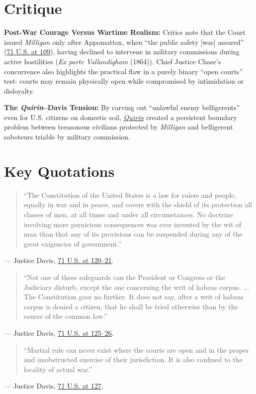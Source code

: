 \documentclass[12pt]{article}
\begin{document}
\section{Critique}
\textbf{Post-War Courage Versus Wartime Realism:} Critics note that the Court issued \textit{Milligan} only after Appomattox, when ``the public safety [was] assured'' (\href{https://supreme.justia.com/cases/federal/us/71/2/}{71 U.S. at 109}), having declined to intervene in military commissions during active hostilities (\textit{Ex parte Vallandigham} (1864)). Chief Justice Chase's concurrence also highlights the practical flaw in a purely binary ``open courts'' test: courts may remain physically open while compromised by intimidation or disloyalty.

\textbf{The \textit{Quirin}--Davis Tension:} By carving out ``unlawful enemy belligerents'' even for U.S. citizens on domestic soil, \href{https://supreme.justia.com/cases/federal/us/317/1/}{\textit{Quirin}} created a persistent boundary problem between treasonous civilians protected by \textit{Milligan} and belligerent saboteurs triable by military commission.

\section{Key Quotations}
\begin{quote}
``The Constitution of the United States is a law for rulers and people, equally in war and in peace, and covers with the shield of its protection all classes of men, at all times and under all circumstances. No doctrine involving more pernicious consequences was ever invented by the wit of man than that any of its provisions can be suspended during any of the great exigencies of government.''
\end{quote}
\noindent --- Justice Davis, \href{https://supreme.justia.com/cases/federal/us/71/2/}{71 U.S. at 120--21}.

\begin{quote}
``Not one of these safeguards can the President or Congress or the Judiciary disturb, except the one concerning the writ of habeas corpus. ... The Constitution goes no further. It does not say, after a writ of habeas corpus is denied a citizen, that he shall be tried otherwise than by the course of the common law.''
\end{quote}
\noindent --- Justice Davis, \href{https://supreme.justia.com/cases/federal/us/71/2/}{71 U.S. at 125--26}.

\begin{quote}
``Martial rule can never exist where the courts are open and in the proper and unobstructed exercise of their jurisdiction. It is also confined to the locality of actual war.''
\end{quote}
\noindent --- Justice Davis, \href{https://supreme.justia.com/cases/federal/us/71/2/}{71 U.S. at 127}.
\end{document}
